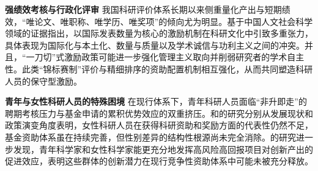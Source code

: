 \textbf{强绩效考核与行政化评审} \quad 我国科研评价体系长期以来侧重量化产出与短期绩效，“唯论文、唯职称、唯学历、唯奖项”的倾向尤为明显。\cite{xuImpactsIncentivesInternational2021}基于中国人文社会科学领域的证据指出，以国际发表数量为核心的激励机制在科研文化中引致多重张力，具体表现为国际化与本土化、数量与质量以及学术诚信与功利主义之间的冲突。并且，“一刀切”式激励政策可能进一步强化管理主义取向并削弱研究者的学术自主性。此类“锦标赛制”评价与精细排序的资助配置机制相互强化，从而共同塑造科研人员的保守型激励。

\textbf{青年与女性科研人员的特殊困境} \quad 在现行体系下，青年科研人员面临“非升即走”的聘期考核压力与基金申请的累积优势效应的双重挤压。\cite{HuangWoGuoNuXingKeYanRenYuanFaZhanXianZhuangTiaoZhanJiZhengCeYanBian2018}和\cite{YuKeXueJiJinZhuLiNuXingKeYanRenYuanChengChangZhengCeChengXiaoYuZhanWang2023}的研究分别从发展现状和政策演变角度表明，女性科研人员在获得科研资助和奖励方面的代表性仍然不足，基金资助体系虽在持续完善，但性别差异的结构性根源尚未完全消除。\cite{LiGaoFengXianGaoHuiBaoXiangMuZiZhuYouZhuYuKeYanChuangXinMaJiYuKeXueDaShuJuDeWenXianOuHeWangLuoFenXi2025}的研究进一步发现，青年科学家和女性科学家能更充分地发挥高风险高回报项目对创新产出的促进效应，表明这些群体的创新潜力在现行竞争性资助体系中可能未被充分释放。


